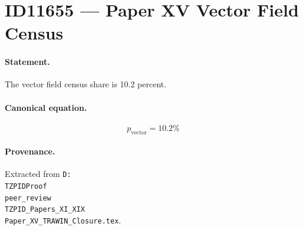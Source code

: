 \section*{ID11655 --- Paper XV Vector Field Census}

\paragraph{Statement.}
The vector field census share is 10.2 percent.

\paragraph{Canonical equation.}
\[
p_{\mathrm{vector}}=10.2\%
\]

\paragraph{Provenance.}
Extracted from \texttt{D:\\TZPIDProof\\peer\_review\\TZPID\_Papers\_XI\_XIX\\Paper\_XV\_TRAWIN\_Closure.tex}.
